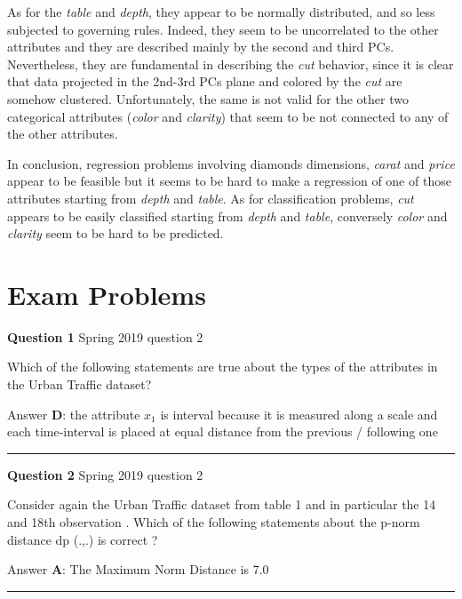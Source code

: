 \documentclass[
]{article}
\begin{document}
As for the \emph{table} and \emph{depth}, they appear to be normally
distributed, and so less subjected to governing rules. Indeed, they seem
to be uncorrelated to the other attributes and they are described mainly
by the second and third PCs. Nevertheless, they are fundamental in
describing the \emph{cut} behavior, since it is clear that data
projected in the 2nd-3rd PCs plane and colored by the \emph{cut} are
somehow clustered. Unfortunately, the same is not valid for the other
two categorical attributes (\emph{color} and \emph{clarity}) that seem
to be not connected to any of the other attributes.

In conclusion, regression problems involving diamonds dimensions,
\emph{carat} and \emph{price} appear to be feasible but it seems to be
hard to make a regression of one of those attributes starting from
\emph{depth} and \emph{table}. As for classification problems,
\emph{cut} appears to be easily classified starting from \emph{depth}
and \emph{table}, conversely \emph{color} and \emph{clarity} seem to be
hard to be predicted.

\newpage

\section{Exam Problems}\label{exam-problems}

\textbf{Question 1} \textbar{} Spring 2019 question 2

Which of the following statements are true about the types of the
attributes in the Urban Traffic dataset?

Answer \textbf{D}: the attribute \(x_1\) is interval because it is
measured along a scale and each time-interval is placed at equal
distance from the previous / following one

\begin{center}\rule{0.5\linewidth}{0.5pt}\end{center}

\textbf{Question 2} \textbar{} Spring 2019 question 2

Consider again the Urban Traffic dataset from table 1 and in particular
the 14 and 18th observation . Which of the following statements about
the p-norm distance dp (.,.) is correct ?

Answer \textbf{A}: The Maximum Norm Distance is 7.0

\begin{center}\rule{0.5\linewidth}{0.5pt}\end{center}
\end{document}
